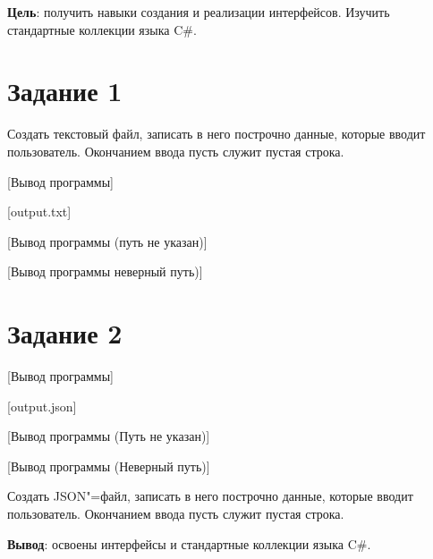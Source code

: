 \documentclass{bsuir}
\newcommand{\csharp}{C{\liberationrm\#}}
\begin{document}
\maketitle
\mainmatter
\renewcommand{\thefigure}{\arabic{figure}}
\renewcommand{\thelisting}{\arabic{listing}}

\textbf{Цель}: получить навыки создания и реализации интерфейсов. Изучить
стандартные коллекции языка \csharp.

\section*{Задание 1}

Создать текстовый файл, записать в него построчно данные, которые вводит
пользователь. Окончанием ввода пусть служит пустая строка.


[Вывод программы]

[output.txt]

[Вывод программы (путь не указан)]

[Вывод программы неверный путь)]

\section*{Задание 2}

[Вывод программы]

[output.json]

[Вывод программы (Путь не указан)]

[Вывод программы (Неверный путь)]

Создать JSON"=файл, записать в него построчно данные, которые вводит
пользователь. Окончанием ввода пусть служит пустая строка.



\textbf{Вывод}: освоены интерфейсы и стандартные коллекции языка \csharp.
\end{document}
